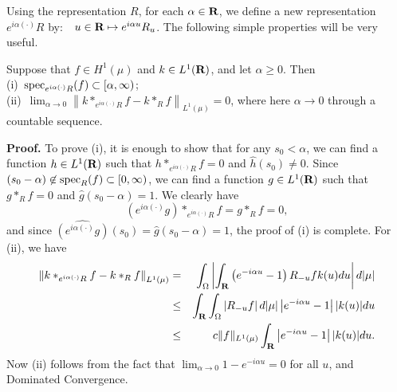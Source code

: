 Using the representation $R$, for each $\alpha\in\R$,
we define a new representation $e^{i\alpha(\cdot)}R$
by:\ \ $u\in \R\mapsto e^{i\alpha u }R_u$.  
The following simple properties will be very useful.
\begin{lemma2}
Suppose that $f\in H^1(\mu)$ and $k\in L^1(\R)$, and
let $\alpha\geq 0$.  Then\\
(i)\  ${\rm spec}_{e^{i\alpha(\cdot)}R} (f)\subset [\alpha,\infty)$;\\
(ii)\ $\lim_{\alpha\rightarrow 0}
    \left\| k*_{e^{i\alpha(\cdot)}R}f-k*_Rf\right\|_{L^1(\mu)}=0$,
    where here $\alpha\rightarrow 0$ through a countable sequence.
\label{lemma2}
\end{lemma2}
{\bf Proof.}  To prove (i), it is enough to show that for any
$s_0<\alpha$, we can find a function
$h\in L^1(\R)$ such that  
$h*_{e^{i\alpha(\cdot)}R}f=0$
and
$\widehat{h}(s_0)\neq 0$.
Since
$(s_0 - \alpha )\not\in{\rm spec}_R(f)\subset [0,\infty)$,
we can find a function $g\in L^1(\R)$
such that $g*_Rf=0$ and $\widehat{g}(s_0-\alpha)=1$.
We clearly have
$$(e^{i\alpha(\cdot )}g)*_{e^{i\alpha(\cdot)}R}f=
g*_Rf=0,$$
and since 
$\widehat{(e^{i\alpha(\cdot )}g)}(s_0)=\widehat{g}(s_0-\alpha)=1$,
the proof of (i) is complete.
For (ii), we have
\begin{eqnarray*}
\left\| k*_{e^{i\alpha(\cdot)}R}f-k*_Rf\right\|_{L^1(\mu)}
			&=&
\int_\O \left|
\int_\R
\left(
e^{-i\alpha u} -1\right) R_{-u}f k(u)du
\right| d|\mu|\\
			&\leq&
\int_\R\int_\O\left|R_{-u}f\right|d|\mu|
\left|e^{-i\alpha u} -1\right||k(u)|du\\
			&\leq&
c\|f\|_{L^1(\mu)}
\int_\R
\left|e^{-i\alpha u} -1\right||k(u)|du.
\end{eqnarray*}
Now (ii) follows from the fact that
$\lim_{\alpha\rightarrow 0} 1-e^{-i\alpha u}=0$ for
all $u$, and 
Dominated Convergence.

